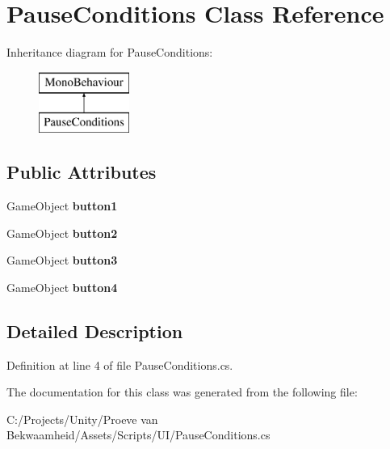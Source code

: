 \hypertarget{class_pause_conditions}{\section{Pause\+Conditions Class Reference}
\label{class_pause_conditions}
}
Inheritance diagram for Pause\+Conditions\+:\begin{figure}[H]
\begin{center}
\leavevmode
\includegraphics[height=2.000000cm]{class_pause_conditions}
\end{center}
\end{figure}
\subsection*{Public Attributes}
\begin{DoxyCompactItemize}
\item 
\hypertarget{class_pause_conditions_a7f54bf5a4189e3d26bbc97a1e2854e63}{Game\+Object {\bfseries button1}}\label{class_pause_conditions_a7f54bf5a4189e3d26bbc97a1e2854e63}

\item 
\hypertarget{class_pause_conditions_a04ca1e5c5090211701027657bb00980d}{Game\+Object {\bfseries button2}}\label{class_pause_conditions_a04ca1e5c5090211701027657bb00980d}

\item 
\hypertarget{class_pause_conditions_abe537000890aabbfa050bfa63890fd13}{Game\+Object {\bfseries button3}}\label{class_pause_conditions_abe537000890aabbfa050bfa63890fd13}

\item 
\hypertarget{class_pause_conditions_a0a07c7c652aedc49d722d046bec5ae4c}{Game\+Object {\bfseries button4}}\label{class_pause_conditions_a0a07c7c652aedc49d722d046bec5ae4c}

\end{DoxyCompactItemize}


\subsection{Detailed Description}


Definition at line 4 of file Pause\+Conditions.\+cs.



The documentation for this class was generated from the following file\+:\begin{DoxyCompactItemize}
\item 
C\+:/\+Projects/\+Unity/\+Proeve van Bekwaamheid/\+Assets/\+Scripts/\+U\+I/Pause\+Conditions.\+cs\end{DoxyCompactItemize}
